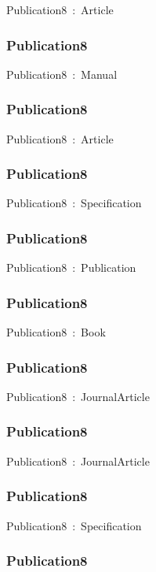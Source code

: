 \documentclass{article}
\begin{document}
Publication8~:~Article

\subsubsection*{Publication8}

Publication8~:~Manual

\subsubsection*{Publication8}

Publication8~:~Article

\subsubsection*{Publication8}

Publication8~:~Specification

\subsubsection*{Publication8}

Publication8~:~Publication

\subsubsection*{Publication8}

Publication8~:~Book

\subsubsection*{Publication8}

Publication8~:~JournalArticle

\subsubsection*{Publication8}

Publication8~:~JournalArticle

\subsubsection*{Publication8}

Publication8~:~Specification

\subsubsection*{Publication8}
\end{document}

